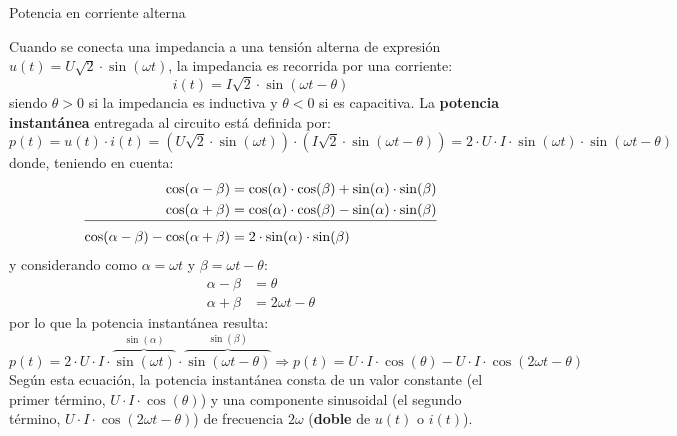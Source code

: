 \documentclass[11pt]{book} %
\makeatletter
\numberwithin{dummy}{section}
\theoremstyle{ocrenumbox}
\theoremstyle{blacknumex}
\theoremstyle{blacknumbox}
\theoremstyle{ocrenum}
\renewcommand{\section}{\@startsection{section}{1}{\z@}
{-4ex \@plus -1ex \@minus -.4ex}
{1ex \@plus.2ex }
{\normalfont\large\sffamily\bfseries}}
\makeatother
\begin{document}
	\section{Potencia en corriente alterna}\label{sec.potencia_CA}
	
	Cuando se conecta una impedancia a una tensión alterna de expresión $u(t) = U\sqrt{2} \cdot\sin (\omega t)$, la impedancia es recorrida por una corriente:
	\begin{equation*}
		i(t) = I\sqrt{2} \cdot \sin (\omega t -\theta)
	\end{equation*}
	siendo $\theta>0$ si la impedancia es inductiva y $\theta<0$ si es capacitiva. La \textbf{potencia instantánea} entregada al circuito está definida por:
	\begin{equation*}
		p(t)=u(t)\cdot i(t)=\left(U\sqrt{2}\cdot \sin (\omega t) \right)\cdot \left(I\sqrt{2} \cdot \sin (\omega t -\theta)\right)=2\cdot U\cdot I\cdot \sin(\omega t)\cdot\sin(\omega t-\theta)
	\end{equation*}
	donde, teniendo en cuenta:
	\begin{align*}
		\cos(\alpha-\beta)&=\cos(\alpha)\cdot\cos(\beta)+\sin(\alpha)\cdot\sin(\beta)\\
		\cos(\alpha+\beta)&=\cos(\alpha)\cdot\cos(\beta)-\sin(\alpha)\cdot\sin(\beta)\\[-10pt]
		\cline{1-2}
		\cos(\alpha-\beta)-\cos(\alpha+\beta)&=2\cdot\sin(\alpha)\cdot\sin(\beta)%
	\end{align*}
	y considerando como $\alpha=\omega t$ y $\beta=\omega t-\theta$:
	\begin{align*}
		\alpha-\beta&=\theta\\
		\alpha +\beta&=2\omega t-\theta
	\end{align*}
	por lo que la potencia instantánea resulta:
	\begin{equation}\label{eq.pot_inst}
		p(t)=2\cdot U\cdot I\cdot \overbrace{\sin(\omega t)}^{\sin(\alpha)}\cdot\overbrace{\sin(\omega t-\theta)}^{\sin(\beta)}\Rightarrow \boxed{p(t)
			=U\cdot I \cdot \cos(\theta)-U\cdot I \cdot\cos(2\omega t-\theta)}
	\end{equation}
	Según esta ecuación, la potencia instantánea consta de un {valor constante} (el primer término, $U\cdot I\cdot \cos(\theta)$) y una componente sinusoidal (el segundo término, $U\cdot I\cdot \cos(2 \omega t-\theta)$) de frecuencia $2\omega$ (\textbf{doble} de $u(t)$ o $i(t)$). 
	
\end{document}
